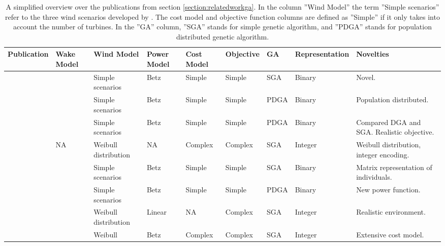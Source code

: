\tabcolsep=0.1cm
\begin{sidewaystable}
\caption{A simplified overview over the publications from section \ref{section:relatedworkga}. In the column ''Wind Model'' the term ''Simple scenarios'' refer to the three wind scenarios developed by \cite{Mosetti}. The cost model and objective function columns are defined as ''Simple'' if it only takes into account the number of turbines. In the ''GA'' column, ''SGA'' stands for simple genetic algorithm, and ''PDGA'' stands for population distributed genetic algorithm.}
\label{table:overview}
\tiny
\begin{center}
\begin{tabular}{l | l | l | l | l | l | l | l | l }
Publication                     & Wake Model       & Wind Model             & Power Model    & Cost Model  & Objective   & GA   & Representation & Novelties \\ 
\hline 
\cite{Mosetti}                & \cite{Jensen}   & Simple scenarios      & Betz \citep{Albring}                & Simple        & Simple        & SGA	& Binary   & Novel. \\
\cite{Grady}                   & \cite{Jensen}   &	 Simple scenarios   &	Betz \citep{Albring}	             & Simple        &	 Simple     & PDGA	& Binary   & Population distributed. \\
\cite{Huang}                  & \cite{Katic}      &	Simple scenarios    & Betz \citep{Albring} 	             & Simple        & Simple       & PDGA	& Binary   & Compared DGA and SGA. Realistic objective. \\
\cite{Mora}                     & NA                   & Weibull distribution  & NA                   & Complex     & Complex    & SGA  & Integer  & Weibull distribution, integer encoding. \\
\cite{Emami}                  & \cite{Jensen}   & Simple scenarios      & Betz \citep{Albring}                & Simple        & Simple        & SGA   & Binary  & Matrix representation of individuals. \\
\cite{Wan}                     & \cite{Jensen}    & Simple scenarios      & Betz \citep{Albring}                & Simple        & Simple       & PDGA   & Binary   & New power function. \\
\cite{Kusiak}                  & \cite{Jensen}    & Weibull distribution  & Linear              & NA             & Complex     & SGA  & Integer   & Realistic environment. \\
\cite{Gonzalez}              & \cite{Frandsen} & Weibull                    & Betz \citep{Albring}                & Complex     & Complex    & SGA   & Integer  & Extensive cost model. \\

\end{tabular}
\end{center}
\end{sidewaystable}
